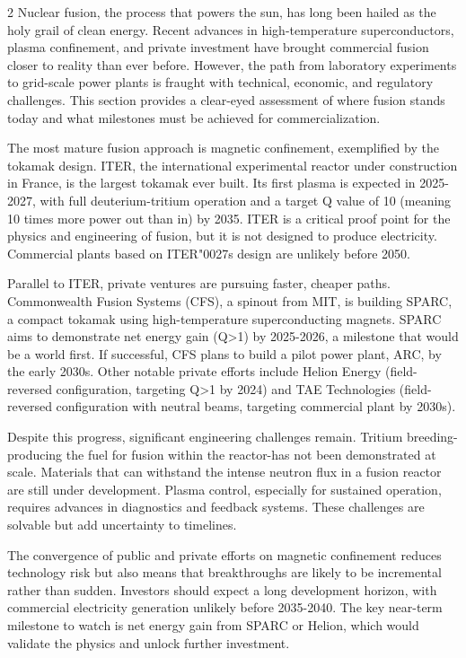 \documentclass[10pt,a4paper]{article}
\newcommand{\BOApos}{{\BOQuoteFont\char"0027}}
\begin{document}
\begin{multicols}{2}
{\small Nuclear fusion, the process that powers the sun, has long been hailed as the holy grail of clean energy. Recent advances in high-temperature superconductors, plasma confinement, and private investment have brought commercial fusion closer to reality than ever before. However, the path from laboratory experiments to grid-scale power plants is fraught with technical, economic, and regulatory challenges. This section provides a clear-eyed assessment of where fusion stands today and what milestones must be achieved for commercialization.}\par
{\small The most mature fusion approach is magnetic confinement, exemplified by the tokamak design. ITER, the international experimental reactor under construction in France, is the largest tokamak ever built. Its first plasma is expected in 2025-2027, with full deuterium-tritium operation and a target Q value of 10 (meaning 10 times more power out than in) by 2035. ITER is a critical proof point for the physics and engineering of fusion, but it is not designed to produce electricity. Commercial plants based on ITER\BOApos{}s design are unlikely before 2050.}\par
{\small Parallel to ITER, private ventures are pursuing faster, cheaper paths. Commonwealth Fusion Systems (CFS), a spinout from MIT, is building SPARC, a compact tokamak using high-temperature superconducting magnets. SPARC aims to demonstrate net energy gain (Q>1) by 2025-2026, a milestone that would be a world first. If successful, CFS plans to build a pilot power plant, ARC, by the early 2030s. Other notable private efforts include Helion Energy (field-reversed configuration, targeting Q>1 by 2024) and TAE Technologies (field-reversed configuration with neutral beams, targeting commercial plant by 2030s).}\par
{\small Despite this progress, significant engineering challenges remain. Tritium breeding-producing the fuel for fusion within the reactor-has not been demonstrated at scale. Materials that can withstand the intense neutron flux in a fusion reactor are still under development. Plasma control, especially for sustained operation, requires advances in diagnostics and feedback systems. These challenges are solvable but add uncertainty to timelines.}\par
{\small The convergence of public and private efforts on magnetic confinement reduces technology risk but also means that breakthroughs are likely to be incremental rather than sudden. Investors should expect a long development horizon, with commercial electricity generation unlikely before 2035-2040. The key near-term milestone to watch is net energy gain from SPARC or Helion, which would validate the physics and unlock further investment.}\par
\end{multicols}
\label{chap:1:end}
\end{document}
